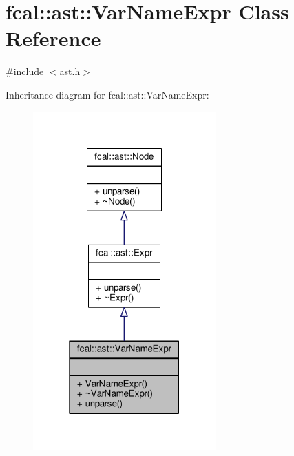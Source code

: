 \hypertarget{classfcal_1_1ast_1_1VarNameExpr}{}\section{fcal\+:\+:ast\+:\+:Var\+Name\+Expr Class Reference}
\label{classfcal_1_1ast_1_1VarNameExpr}


{\ttfamily \#include $<$ast.\+h$>$}



Inheritance diagram for fcal\+:\+:ast\+:\+:Var\+Name\+Expr\+:
\nopagebreak
\begin{figure}[H]
\begin{center}
\leavevmode
\includegraphics[width=199pt]{classfcal_1_1ast_1_1VarNameExpr__inherit__graph}
\end{center}
\end{figure}


